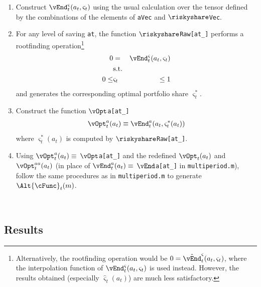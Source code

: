 \documentclass[titlepage]{\econtex}
\begin{document}
\begin{enumerate}

\item Construct
$\vEnd_{t}^{\varsigma}({a}_{t},\varsigma_{t})$ using the usual calculation
over the tensor defined by the combinations of the elements of
\texttt{aVec} and \texttt{$\riskyshare$Vec}.

\item For any level of saving \texttt{at}, the function \texttt{$\riskyshare$Raw[at\_]} performs a rootfinding
operation\footnote{Alternatively, the rootfinding operation would be
$0 = \hat{\vEnd}^{\varsigma}_{t}({a}_{t},\varsigma_{t})$, where the
interpolation function of $\vEnd_{t}^{\varsigma}({a}_{t},\varsigma_{t})$ is
used instead. However, the results obtained (especially
$\hat{\varsigma}_{t}({a}_{t})$) are much less satisfactory.}
\begin{eqnarray}
0 & = & \vEnd^{\varsigma}_{t}({a}_{t},\varsigma_{t})
\\      & \text{s.t.} & \nonumber
\\      0 \leq & \varsigma_{t} & \leq 1
\end{eqnarray}
and generates the corresponding optimal portfolio share
$\varsigma^{\ast}_{t}$.

\item Construct the function \texttt{$\vOpt$a[at\_]}
\begin{eqnarray}
\vOpt_{t}^{a}({a}_{t}) \equiv
\vEnd_{t}^{a}({a}_{t},\varsigma^{\ast}_{t}({a}_{t}))
\end{eqnarray}
where $\varsigma^{\ast}_{t}({a}_{t})$ is computed by \texttt{$\riskyshare$Raw[at\_]}.

\item Using $\vOpt_{t}^{a}({a}_{t}) \equiv$
  \texttt{$\vOpt$a[at\_]} and the redefined
  $\vOpt_{t}({a}_{t})$ and $\vOpt_{t}^{{aa}}({a}_{t})$ (in
  place of $\vEnd_{t}^{a}({a}_{t}) \equiv $ \texttt{$\vEnd$a[at\_]} in
  \texttt{multiperiod.m}), follow the same procedures as in
  \texttt{multiperiod.m} to generate $\Alt{\cFunc}_{t}({m})$.

\end{enumerate}

\
\subsection{Results}
\end{document}
